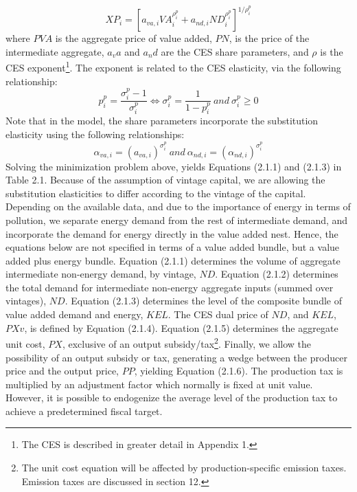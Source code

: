 \documentclass[12pt]{article}
\begin{document}
$$
X\!P_i = \left[a_{va,i}V\!A_{i}^{\rho_{i}^{p}}+a_{nd,i}N\!D_{i}^{\rho_{i}^p}\right]^{1/\rho_i^p}
$$
where $PVA$ is the aggregate price of value added, $PN$, is the price of the intermediate aggregate, $a_va$ and $a_nd$ are the CES share parameters, and $\rho$ is the CES exponent\footnote{The CES is described in greater detail in Appendix 1.}. The exponent is related to the CES elasticity, via the following relationship:
$$
p_i^p = \frac{\sigma_i^p-1}{\sigma_i^p}\Longleftrightarrow \sigma_i^p = \frac{1}{1-p_i^p} \ and \ \sigma_i^p \ge 0
$$
Note that in the model, the share parameters incorporate the substitution elasticity using the following relationships:
$$
\alpha_{va,i} = (a_{va,i})^{\sigma_i^p} \ and \ \alpha_{nd,i} = (\alpha_{nd,i})^{\sigma_i^p}
$$
Solving the minimization problem above, yields Equations (2.1.1) and (2.1.3) in Table 2.1. Because of the assumption of vintage capital, we are allowing the substitution elasticities to differ according to the vintage of the capital. Depending on the available data, and due to the importance of energy in terms of pollution, we separate energy demand from the rest of intermediate demand, and incorporate the demand for energy directly in the value added nest. Hence, the equations below are not specified in terms of a value added bundle, but a value added plus energy bundle. Equation (2.1.1) determines the volume of aggregate intermediate non-energy demand, by vintage, $ND$. Equation (2.1.2) determines the total demand for intermediate non-energy aggregate inputs (summed over vintages), $ND$. Equation (2.1.3) determines the level of the composite bundle of value added demand and energy, $KEL$. The CES dual price of $ND$, and $KEL$, $PXv$, is defined by Equation (2.1.4). Equation (2.1.5) determines the aggregate unit cost, $PX$, exclusive of an output subsidy/tax\footnote{The unit cost equation will be affected by production-specific emission taxes. Emission taxes are discussed in section 12.}. Finally, we allow the possibility of an output subsidy or tax, generating a wedge between the producer price and the output price, $PP$, yielding Equation (2.1.6). The production tax is multiplied by an adjustment factor which normally is fixed at unit value. However, it is possible to endogenize the average level of the production tax to achieve a predetermined fiscal target.

\newpage
\end{document}
